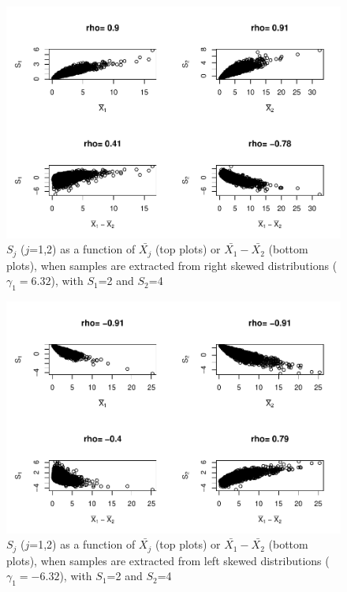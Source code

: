 \documentclass[
  english,
  man,mask]{apa6}
\begin{document}
\begin{figure}
\centering
\includegraphics{Correlation_files/figure-latex/pltSDHetbalRskew-1.pdf}
\caption{\label{fig:pltSDHetbalRskew}\(S_j\) (\(j\)=1,2) as a function of \(\bar{X_j}\) (top plots) or \(\bar{X_1}-\bar{X_2}\) (bottom plots), when samples are extracted from right skewed distributions (\(\gamma_1 = 6.32\)), with \(S_1\)=2 and \(S_2\)=4}
\end{figure}

\begin{figure}
\centering
\includegraphics{Correlation_files/figure-latex/pltSDHetbalLskew-1.pdf}
\caption{\label{fig:pltSDHetbalLskew}\(S_j\) (\(j\)=1,2) as a function of \(\bar{X_j}\) (top plots) or \(\bar{X_1}-\bar{X_2}\) (bottom plots), when samples are extracted from left skewed distributions (\(\gamma_1 = -6.32\)), with \(S_1\)=2 and \(S_2\)=4}
\end{figure}
\end{document}
